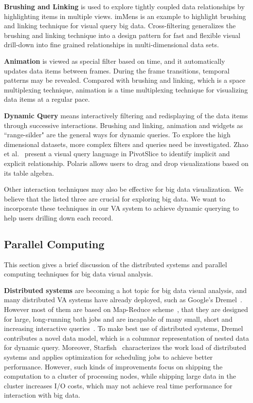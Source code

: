 \documentclass[journal]{vgtc}                %
\begin{document}
{\textbf{Brushing and Linking} is used to explore  tightly coupled data relationships by highlighting items in multiple views. imMens \cite{2013-immens} is an example to highlight brushing and linking technique for visual query big data. Cross-filtering \cite{weaver2010cross} generalizes the brushing and linking technique into a design pattern for fast and flexible visual drill-down into fine grained relationships in multi-dimensional data sets. 


\textbf{Animation} is viewed as special filter based on time, and it automatically updates data items between frames. During the frame transitions, temporal patterns may be revealed. Compared with brushing and linking, which is a space multiplexing technique, animation is a time multiplexing technique for visualizing data items at a regular pace.

\textbf{Dynamic Query} means interactively filtering and redisplaying of the data items through successive interactions. Brushing and linking, animation and widgets  as ``range-silder" are the general ways for dynamic queries. To explore the high dimensional datasets, more complex filters and queries need be investigated. Zhao et al.~\cite{zhao2013interactive} present a visual query language in PivotSlice to identify implicit and explicit relationship. Polaris \cite{stolte2002polaris} allows users to drag and drop visualizations based on its table algebra.

Other interaction techniques may also be effective for big data visualization. We believe that the listed three are crucial for exploring big data. We want to incorporate these techniques in our VA system to achieve dynamic querying to help users drilling down each record.
 

\subsection{Parallel Computing}
This section gives a brief discussion of the distributed systems and parallel computing techniques for big data visual analysis.

\textbf{Distributed systems} are becoming a hot topic for big data visual analysis, and many distributed VA systems have already deployed, such as Google's Dremel~\cite{melnik2010dremel}. However most of them are based on Map-Reduce scheme~\cite{Dean2008}, that they are designed for large, long-running bath jobs  and are incapable of many small, short and increasing interactive queries~\cite{Chen:2012}. To make best use of distributed systems, Dremel~\cite{melnik2010dremel} contributes a novel data model, which is a columnar representation of nested data for dynamic query. Moreover, Starfish~\cite{herodotou} characterizes the work load of distributed systems and applies optimization for scheduling jobs to achieve better performance. However, such kinds of improvements focus on shipping the computation to a cluster of processing nodes, while shipping large data in the cluster increases I/O costs, which may not achieve real time performance for interaction with big data. 

}
\end{document}
